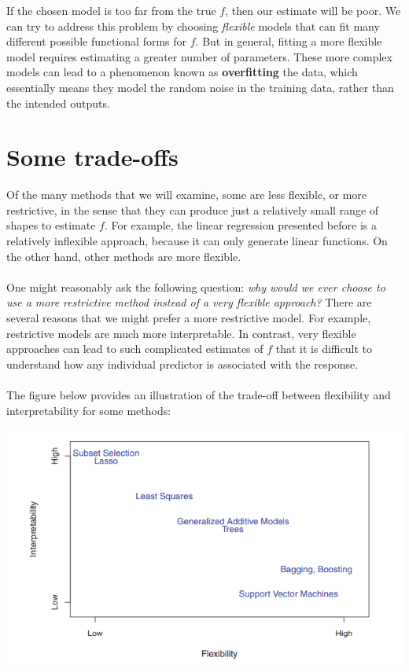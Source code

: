 If the chosen model is too far from the true $f$, then our estimate will be poor. We can try to address this problem by choosing \textit{flexible} models that can fit many different possible functional forms for $f$. But in general, fitting a more flexible model requires estimating a greater number of parameters. These more complex models can lead to a phenomenon known as \textbf{overfitting} the data, which essentially means they model the random noise in the training data, rather than the intended outputs.

\section{Some trade-offs}
Of the many methods that we will examine, some are less flexible, or more restrictive, in the sense that they can produce just a relatively small range of shapes to estimate $f$. For example, the linear regression presented before is a relatively inflexible approach, because it can only generate linear functions. On the other hand, other methods are more flexible.\\\\
One might reasonably ask the following question: \textit{why would we ever
choose to use a more restrictive method instead of a very flexible approach?} There are several reasons that we might prefer a more restrictive model. For example, restrictive models are much more interpretable. In contrast, very flexible approaches can lead to such complicated estimates of $f$ that it is difficult to understand how any individual predictor is associated with the response.\\\\
The figure below provides an illustration of the trade-off between flexibility and interpretability for some methods:
\begin{center}
    \includegraphics[scale=0.8]{images/trade-off.png}
\end{center}

